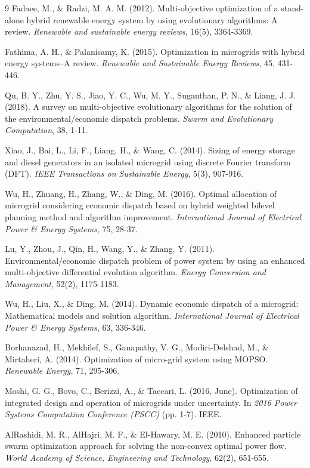 \documentclass[final,3p,times]{elsarticle}
\begin{document}
\begin{thebibliography}{9}
Fadaee, M., \& Radzi, M. A. M. (2012). Multi-objective optimization of a stand-alone hybrid renewable energy system by using evolutionary algorithms: A review. \textit{Renewable and sustainable energy reviews}, 16(5), 3364-3369.

Fathima, A. H., \& Palanisamy, K. (2015). Optimization in microgrids with hybrid energy systems–A review. \textit{Renewable and Sustainable Energy Reviews}, 45, 431-446.

Qu, B. Y., Zhu, Y. S., Jiao, Y. C., Wu, M. Y., Suganthan, P. N., \& Liang, J. J. (2018). A survey on multi-objective evolutionary algorithms for the solution of the environmental/economic dispatch problems. \textit{Swarm and Evolutionary Computation}, 38, 1-11.

Xiao, J., Bai, L., Li, F., Liang, H., \& Wang, C. (2014). Sizing of energy storage and diesel generators in an isolated microgrid using discrete Fourier transform (DFT). \textit{IEEE Transactions on Sustainable Energy}, 5(3), 907-916.

Wu, H., Zhuang, H., Zhang, W., \& Ding, M. (2016). Optimal allocation of microgrid considering economic dispatch based on hybrid weighted bilevel planning method and algorithm improvement. \textit{International Journal of Electrical Power \& Energy Systems}, 75, 28-37.

Lu, Y., Zhou, J., Qin, H., Wang, Y., \& Zhang, Y. (2011). Environmental/economic dispatch problem of power system by using an enhanced multi-objective differential evolution algorithm. \textit{Energy Conversion and Management}, 52(2), 1175-1183.

Wu, H., Liu, X., \& Ding, M. (2014). Dynamic economic dispatch of a microgrid: Mathematical models and solution algorithm. \textit{International Journal of Electrical Power \& Energy Systems}, 63, 336-346.

Borhanazad, H., Mekhilef, S., Ganapathy, V. G., Modiri-Delshad, M., \& Mirtaheri, A. (2014). Optimization of micro-grid system using MOPSO. \textit{Renewable Energy}, 71, 295-306. 

Moshi, G. G., Bovo, C., Berizzi, A., \& Taccari, L. (2016, June). Optimization of integrated design and operation of microgrids under uncertainty. In \textit{2016 Power Systems Computation Conference (PSCC)} (pp. 1-7). IEEE.

AlRashidi, M. R., AlHajri, M. F., \& El-Hawary, M. E. (2010). Enhanced particle swarm optimization approach for solving the non-convex optimal power flow. \textit{World Academy of Science, Engineering and Technology}, 62(2), 651-655.


\end{thebibliography}
\end{document}
